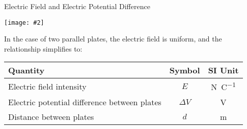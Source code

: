 \documentclass[12pt,aspectratio=169]{beamer}
\newcommand{\pic}[2]{\texttt{[image: \#2]}}
\newcommand{\eq}[2]{\vspace{#1}{
    \Large\begin{displaymath}#2\end{displaymath}}
}
\begin{document}
\begin{frame}{Electric Field and Electric Potential Difference}
  \begin{center}
    \pic{.4}{elfield-600x205.png}
  \end{center}
  \vspace{-.1in}In the case of two parallel plates, the electric field is
  uniform, and the relationship simplifies to:

  \eq{-.2in}{
    \boxed{E=\frac{\Delta V}{d}}
  }
  \begin{center}
    \begin{tabular}{l|c|c}
      \rowcolor{pink}
      \textbf{Quantity} & \textbf{Symbol} & \textbf{SI Unit} \\ \hline
      Electric field intensity & $E$ & \si{\newton\per\coulomb}\\
      Electric potential difference between plates & $\Delta V$ &
      \si{\volt} \\
      Distance between plates       & $d$ & \si{\metre}
    \end{tabular}
  \end{center}
\end{frame}
\end{document}
